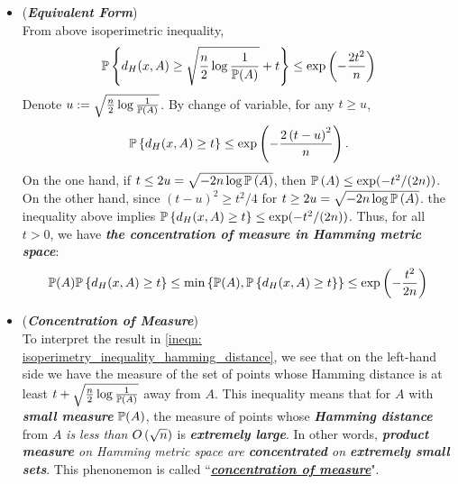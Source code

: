 \documentclass[11pt]{article}
\begin{document}
\begin{itemize}
\item \begin{remark} (\textbf{\emph{Equivalent Form}})\\
From above isoperimetric inequality, 
\begin{align*}
{\mathbb P}\left\{d_{H}(x, A) \ge \sqrt{\frac{n}{2}\log \frac{1}{{\mathbb P}(A)}} + t\right\} \le \exp\left(-\frac{2t^2}{n}\right)
\end{align*} Denote $u := \sqrt{\frac{n}{2}\log \frac{1}{{\mathbb P}(A)}}$. By change of variable, for any $t \ge u$, 
\begin{align*}
{\mathbb P}\left\{d_{H}(x, A) \ge t\right\} \le \exp\left(-\frac{2\left(t - u\right)^2}{n}\right).
\end{align*} On the one hand, if $t \le 2u = \sqrt{-2 n \log {\mathbb P}\left(A\right)}$, then ${\mathbb P}\left(A\right) \le \exp(-t^2/(2n))$. On the other hand,
since $(t - u)^2 \ge t^2/4$ for $t \ge 2u =  \sqrt{-2 n \log {\mathbb P}\left(A\right)}$. the inequality above implies
${\mathbb P}\left\{d_{H}(x, A) \ge t\right\} \le  \exp(-t^2/(2n))$.
Thus, for all $t > 0$, we have \textbf{\emph{the concentration of measure in Hamming metric space}}:
\begin{align}
{\mathbb P}(A){\mathbb P}\left\{d_{H}(x, A) \ge t\right\} \le \min\left\{{\mathbb P}(A), {\mathbb P}\left\{d_{H}(x, A) \ge t\right\}\right\} \le  \exp\left(-\frac{t^2}{2n}\right) \label{ineqn: concentration_measure_hamming_distance}
\end{align}
\end{remark}


\item \begin{remark} (\textbf{\emph{Concentration of Measure}})\\
To interpret the result in \eqref{ineqn: isoperimetry_inequality_hamming_distance}, we see that on the left-hand side we have the measure of the set of points whose Hamming distance is at least $t + \sqrt{\frac{n}{2}\log \frac{1}{{\mathbb P}(A)}}$ away from $A$. This inequality means that for $A$ with \emph{\textbf{small measure}} ${\mathbb P}(A)$, the measure of points whose \emph{\textbf{Hamming distance}} from $A$ \emph{is less than} $O\left(\sqrt{n}\right)$ is \emph{\textbf{extremely large}}.
In other words, \emph{\textbf{product measure} on Hamming metric space are \textbf{concentrated} on \textbf{extremely small sets}}. This phenonemon is called ``\underline{\textbf{\emph{concentration of measure}}}". 
\end{remark}


\end{itemize}
\end{document}

